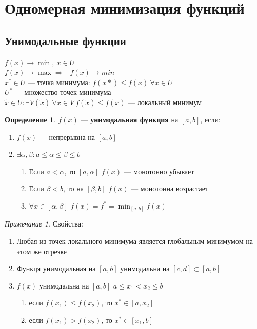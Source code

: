 \documentclass[oneside]{book}
\theoremstyle{plain}
\theoremstyle{remark}
\newtheorem*{remark}{Примечание}
\theoremstyle{definition}
\newtheorem*{definition}{Определение}
\begin{document}
\section{Одномерная минимизация функций}
\label{sec:orgd220ee1}
\subsection{Унимодальные функции}
\label{sec:org031f7cc}
\(f(x) \to \min,\ x \in U\) \\
\(f(x) \to \max \Rightarrow -f(x) \to min\) \\
\(x^* \in U\) --- точка минимума: \(f(x*) \le f(x)\ \forall x \in U\) \\
\(U^*\) --- множество точек минимума \\
\(\tilde{x} \in U: \exists V(\tilde{x})\ \forall x \in V\ f(\tilde{x}) \le f(x)\) --- локальный минимум
\begin{definition}
\(f(x)\) --- \textbf{унимодальная функция} на \([a, b]\), если:
\begin{enumerate}
\item \(f(x)\) --- непрерывна на \([a, b]\)
\item \(\exists \alpha, \beta: a \le \alpha\le\beta\le b\)
\begin{enumerate}
\item Если \(a < \alpha\), то \([a, \alpha]\) \(f(x)\) --- монотонно убывает
\item Если \(\beta < b\), то на \([\beta, b]\) \(f(x)\) --- монотонна возрастает
\item \(\forall x\in[\alpha, \beta]\) \(f(x) = f^* = \min_{[a, b]}f(x)\)
\end{enumerate}
\end{enumerate}
\end{definition}
\begin{remark}
Свойства:
\begin{enumerate}
\item Любая из точек локального минимума является глобальным минимумом на этом же отрезке
\item Функця унимодальная на \([a, b]\)  унимодальна на \([c, d] \subset [a, b]\)
\item \(f(x)\) унимодальна на \([a, b]\) \(a \le x_1 < x_2 \le b\)
\begin{enumerate}
\item если \(f(x_1)\le f(x_2)\), то \(x^* \in [a, x_2]\)
\item если \(f(x_1) > f(x_2)\), то \(x^* \in [x_1, b]\)
\end{enumerate}
\end{enumerate}
\end{remark}
\end{document}
